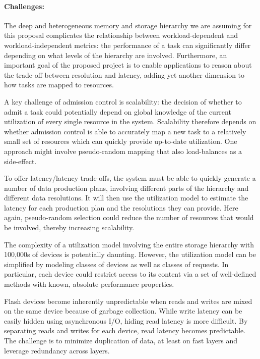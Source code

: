 \paragraph{Challenges:}
The deep and heterogeneous memory and storage hierarchy we are assuming for
this proposal complicates the relationship between workload-dependent and
workload-independent metrics: the performance of a task can significantly
differ depending on what levels of the hierarchy are involved. Furthermore, an
important goal of the proposed project is to enable applications to reason
about the trade-off between resolution and latency, adding yet another
dimension to how tasks are mapped to resources.

\begin{tightItemize}

\item A key challenge of admission control is scalability: the
decision of whether to admit a task could potentially depend on
global knowledge of the current utilization of every single resource
in the system. Scalability therefore depends on whether admission
control is able to accurately map a new task to a relatively small
set of resources which can quickly provide up-to-date utilization.
One approach might involve pseudo-random mapping that also load-balances
as a side-effect.

\item To offer latency/latency trade-offs, the system must be able
to quickly generate a number of data production plans, involving
different parts of the hierarchy and different data resolutions.
It will then use the utilization model to estimate the latency for
each production plan and the resolutions they can provide. Here
again, pseudo-random selection could reduce the number of resources
that would be involved, thereby increasing scalability.

\item The complexity of a utilization model involving the entire
storage hierarchy with 100,000s of devices is potentially daunting.
However, the utilization model can be simplified by modeling classes
of devices as well as classes of requests. In particular, each
device could restrict access to its content via a set of well-defined
methods with known, absolute performance properties.

\item Flash devices become inherently unpredictable when reads and
writes are mixed on the same device because of garbage collection.
While write latency can be easily hidden using asynchronous I/O,
hiding read latency is more difficult. By separating reads and
writes for each device, read latency becomes predictable. The
challenge is to minimize duplication of data, at least on fast
layers and leverage redundancy across layers.

\end{tightItemize}



